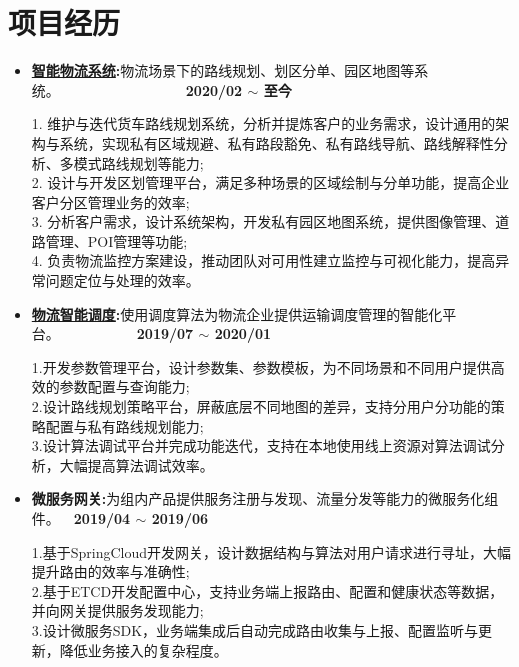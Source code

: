 \documentclass[letterpaper, UTF8, 11pt]{article}
\begin{document}
	\section*{\textbf{项目经历}}\vspace{-0.1in}
	\begin{itemize}	
		\item \textbf{\href{https://lbsyun.baidu.com/solutions/logisticsmap}{智能物流系统}:}{物流场景下的路线规划、划区分单、园区地图等系统。}~~~~~~~~~~~~~~~~~~\textbf{2020/02 $\sim$ 至今}
		
		1. 维护与迭代货车路线规划系统，分析并提炼客户的业务需求，设计通用的架构与系统，实现私有区域规避、私有路段豁免、私有路线导航、路线解释性分析、多模式路线规划等能力;\\
		2. 设计与开发区划管理平台，满足多种场景的区域绘制与分单功能，提高企业客户分区管理业务的效率;\\
		3. 分析客户需求，设计系统架构，开发私有园区地图系统，提供图像管理、道路管理、POI管理等功能;\\
		4. 负责物流监控方案建设，推动团队对可用性建立监控与可视化能力，提高异常问题定位与处理的效率。
		
		\vspace{0.04in}

		\item \textbf{\href{https://lbsyun.baidu.com/solutions/scheduling}{物流智能调度}:}{使用调度算法为物流企业提供运输调度管理的智能化平台。}~~~~~~~~~~~\textbf{2019/07 $\sim$ 2020/01}
		
		1.开发参数管理平台，设计参数集、参数模板，为不同场景和不同用户提供高效的参数配置与查询能力;\\
		2.设计路线规划策略平台，屏蔽底层不同地图的差异，支持分用户分功能的策略配置与私有路线规划能力;\\
		3.设计算法调试平台并完成功能迭代，支持在本地使用线上资源对算法调试分析，大幅提高算法调试效率。
		
		\vspace{0.04in}

		\item \textbf{微服务网关:}{为组内产品提供服务注册与发现、流量分发等能力的微服务化组件。}~~\textbf{2019/04 $\sim$ 2019/06}
		
		1.基于SpringCloud开发网关，设计数据结构与算法对用户请求进行寻址，大幅提升路由的效率与准确性;\\
		2.基于ETCD开发配置中心，支持业务端上报路由、配置和健康状态等数据，并向网关提供服务发现能力;\\
		3.设计微服务SDK，业务端集成后自动完成路由收集与上报、配置监听与更新，降低业务接入的复杂程度。
		

\end{itemize}
\end{document}
